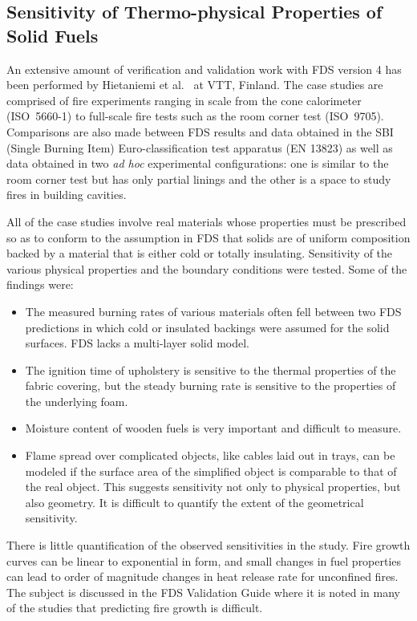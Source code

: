 \documentclass[11pt]{book}
\begin{document}
\subsection{Sensitivity of Thermo-physical Properties of Solid Fuels}

An  extensive amount  of  verification and  validation  work with  FDS version 4  has been  performed by Hietaniemi et al.~\cite{Hietaniemi:1} at VTT,
Finland. The case  studies are  comprised of fire  experiments   ranging  in   scale  from  the   cone  calorimeter (ISO~5660-1)
to  full-scale fire  tests such as  the room  corner test (ISO~9705).  Comparisons are also  made between  FDS results  and data obtained  in the
SBI (Single  Burning Item)  Euro-classification test apparatus (EN  13823) as  well as  data obtained in  two {\em  ad hoc} experimental
configurations:  one is similar  to the room  corner test but has only  partial linings and the other is a  space to study fires in building
cavities.

All of the  case studies involve real materials  whose properties must be prescribed  so as to conform  to the assumption in  FDS that solids are of
uniform composition backed by a material that is either cold or totally insulating. Sensitivity of the various physical properties and the boundary
conditions were tested. Some of the findings were:
\begin{itemize}
\item  The measured  burning  rates of  various  materials often  fell
between two FDS  predictions in which cold or  insulated backings were assumed for the solid surfaces. FDS lacks a multi-layer solid model.
\item  The ignition  time of  upholstery is  sensitive to  the thermal
properties  of the  fabric covering,  but the  steady burning  rate is sensitive to the properties of the underlying foam.
\item Moisture content of wooden fuels is very important and difficult
to measure.
\item Flame spread  over complicated objects, like cables  laid out in
trays, can be modeled if the  surface area of the simplified object is comparable to that  of the real object. This  suggests sensitivity not only to
physical properties,  but also geometry.  It is  difficult to quantify the extent of the geometrical sensitivity.
\end{itemize}
There is  little quantification of  the observed sensitivities  in the study. Fire  growth curves can be  linear to exponential  in form, and small
changes in  fuel  properties  can lead  to  order of  magnitude changes  in heat  release rate  for unconfined  fires. The  subject is
discussed  in the  FDS  Validation Guide \cite{FDS_Validation_Guide} where it is  noted in many of the studies  that predicting fire growth is difficult.
\end{document}
